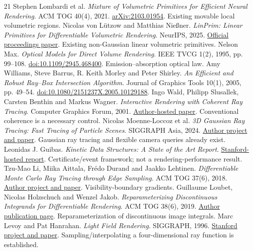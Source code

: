 \documentclass[11pt,letterpaper]{article}
\begin{document}
\begin{thebibliography}{21}
 Stephen Lombardi et al. \textit{Mixture of Volumetric Primitives for Efficient Neural Rendering}. ACM TOG 40(4), 2021. \href{https://arxiv.org/abs/2103.01954}{arXiv:2103.01954}. Existing movable local volumetric regions.
 Nicolas von L\"utzow and Matthias Nie\ss ner. \textit{LinPrim: Linear Primitives for Differentiable Volumetric Rendering}. NeurIPS, 2025. \href{https://papers.nips.cc/paper_files/paper/2025/file/1f135570d413e483ffb7528ae7fbf5e1-Paper-Conference.pdf}{Official proceedings paper}. Existing non-Gaussian linear volumetric primitives.
 Nelson Max. \textit{Optical Models for Direct Volume Rendering}. IEEE TVCG 1(2), 1995, pp. 99--108. \href{https://doi.org/10.1109/2945.468400}{doi:10.1109/2945.468400}. Emission--absorption optical law.
 Amy Williams, Steve Barrus, R. Keith Morley and Peter Shirley. \textit{An Efficient and Robust Ray--Box Intersection Algorithm}. Journal of Graphics Tools 10(1), 2005, pp. 49--54. \href{https://doi.org/10.1080/2151237X.2005.10129188}{doi:10.1080/2151237X.2005.10129188}.
\newpage
{} Ingo Wald, Philipp Slusallek, Carsten Benthin and Markus Wagner. \textit{Interactive Rendering with Coherent Ray Tracing}. Computer Graphics Forum, 2001. \href{https://www.sci.utah.edu/~wald/Publications/2001/CRT/CRT.pdf}{Author-hosted paper}. Conventional coherence is a necessary control.
 Nicolas Moenne-Loccoz et al. \textit{3D Gaussian Ray Tracing: Fast Tracing of Particle Scenes}. SIGGRAPH Asia, 2024. \href{https://gaussiantracer.github.io/}{Author project and paper}. Gaussian ray tracing and flexible camera queries already exist.
 Leonidas J. Guibas. \textit{Kinetic Data Structures: A State of the Art Report}. \href{https://graphics.stanford.edu/courses/cs428-03-spring/Papers/readings/CollaborativeProcessing/g-kds.pdf}{Stanford-hosted report}. Certificate/event framework; not a rendering-performance result.
 Tzu-Mao Li, Miika Aittala, Fr\'edo Durand and Jaakko Lehtinen. \textit{Differentiable Monte Carlo Ray Tracing through Edge Sampling}. ACM TOG 37(6), 2018. \href{https://people.csail.mit.edu/tzumao/diffrt/}{Author project and paper}. Visibility-boundary gradients.
 Guillaume Loubet, Nicolas Holzschuch and Wenzel Jakob. \textit{Reparameterizing Discontinuous Integrands for Differentiable Rendering}. ACM TOG 38(6), 2019. \href{https://rgl.epfl.ch/publications/Loubet2019Reparameterizing}{Author publication page}. Reparameterization of discontinuous image integrals.
 Marc Levoy and Pat Hanrahan. \textit{Light Field Rendering}. SIGGRAPH, 1996. \href{https://graphics.stanford.edu/papers/light/}{Stanford project and paper}. Sampling/interpolating a four-dimensional ray function is established.

\end{thebibliography}
\end{document}
